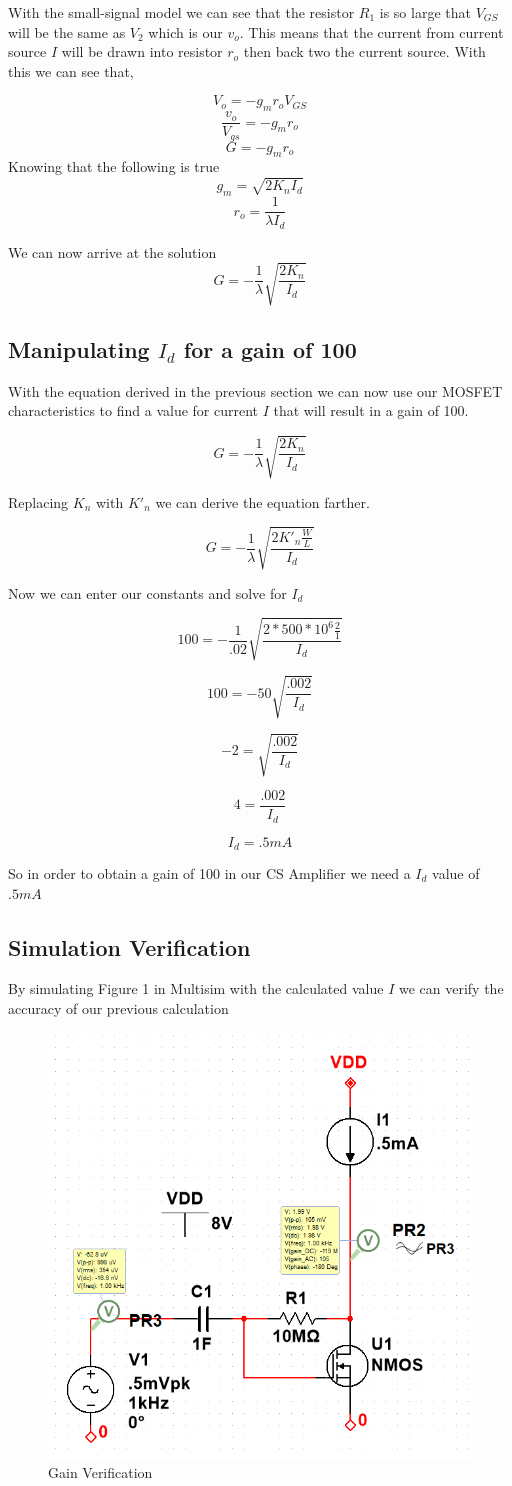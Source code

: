 \documentclass[12pt]{article}
\begin{document}
With the small-signal model we can see that the resistor $R_1$ is so large that  $V_{GS}$ will be the same as $V_2$ which is our $v_o$. This means that the current from current source $I$ will be drawn into resistor $r_o$ then back two the current source. With this we can see that,

$$V_o = -g_m r_o V_{GS}$$
$$\frac{v_o}{V_{gs}}  = -g_m r_o$$
$$G = -g_m r_o $$
Knowing that the following is true
$$g_m = \sqrt{2K_n I_d}$$
$$r_o = \frac{1}{\lambda I_d}$$

 We can now arrive at the solution
$$G = -\frac{1}{\lambda} \sqrt{\frac{2 K_n}{I_d}}$$


\subsection{Manipulating $I_d$ for a gain of 100}

With the equation derived in the previous section we can now use our MOSFET characteristics to find a value for current $I$ that will result in a gain of 100.

$$G = -\frac{1}{\lambda} \sqrt{\frac{2 K_n}{I_d}}$$

Replacing $K_n$ with $K'_n$ we can derive the equation farther.


$$G = -\frac{1}{\lambda} \sqrt{\frac{2 K'_n \frac{W}{L}}{I_d}}$$

Now we can enter our constants and solve for $I_d$

$$100 = -\frac{1}{.02} \sqrt{\frac{2*500*10^6 \frac{2}{1}}{I_d}}$$

$$100 = -50 \sqrt{\frac{.002}{I_d}}$$

$$-2 = \sqrt{\frac{.002}{I_d}}$$

$$4 = \frac{.002}{I_d}$$

$$I_d = .5mA$$

So in order to obtain a gain of 100 in our CS Amplifier we need a $I_d$ value of $.5mA$


\subsection{Simulation Verification}

By simulating Figure 1 in Multisim with the calculated value $I$ we can verify the accuracy of our previous calculation

\begin{figure}[h]
	\label{fig:amp}
	\caption{Gain Verification}
	\centering
	\includegraphics[width=.5\textwidth]{cssimulation}
\end{figure}
\end{document}
